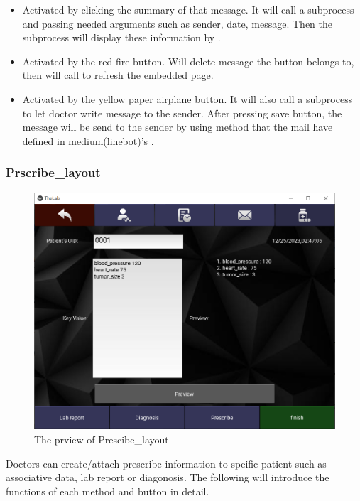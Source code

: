 \documentclass{article}
\begin{document}
\begin{itemize}
  \item {} Activated by clicking the summary of that message. It will call a subprocess and passing needed arguments such as sender, date, message. Then the subprocess will display these information by .
  \item {} Activated by the red fire button. Will delete message the button belongs to, then will call  to refresh the embedded page.
  \item {} Activated by the yellow paper airplane button. It will also call a subprocess to let doctor write message to the sender. After pressing save button, the message will be send to the sender by using  method that the mail have defined in medium(linebot)'s .
\end{itemize}

\subsubsection*{Prscribe\_layout}
\begin{figure}[h]
  \centering
  \includegraphics[scale = 0.5]{asset/doctor_gui/frontend_prescribe.png}
  \caption{The prview of Prescibe\_layout}
  \label{fig:frontend_prescribe}
\end{figure}

Doctors can create/attach prescribe information to speific patient such as associative data, lab report or diagonosis. The following will introduce the functions of each method and button in detail.
\end{document}
